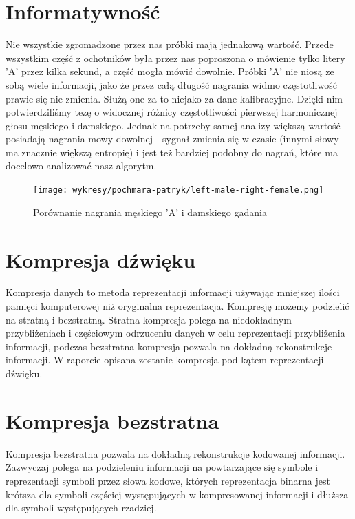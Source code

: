 \documentclass[a4paper,12pt]{extarticle}
\begin{document}
\section*{Informatywność}

Nie wszystkie zgromadzone przez nas próbki mają jednakową wartość. Przede wszystkim część z ochotników była przez nas poproszona o mówienie tylko litery 'A' przez kilka sekund, a część mogła mówić dowolnie. Próbki 'A' nie niosą ze sobą wiele informacji, jako że przez całą długość nagrania widmo częstotliwość prawie się nie zmienia. Służą one za to niejako za dane kalibracyjne. Dzięki nim potwierdziliśmy tezę o widocznej różnicy częstotliwości pierwszej harmonicznej głosu męskiego i damskiego. Jednak na potrzeby samej analizy większą wartość posiadają nagrania mowy dowolnej - sygnał zmienia się w czasie (innymi słowy ma znacznie większą entropię) i jest też bardziej podobny do nagrań, które ma docelowo analizować nasz algorytm.

\begin{figure}[h!]
\centering
\texttt{[image: wykresy/pochmara-patryk/left-male-right-female.png]}
\caption{Porównanie nagrania męskiego 'A' i damskiego gadania}
\end{figure}

\newpage

\section{Kompresja dźwięku}
\label{sec:kompresja}

Kompresja danych to metoda reprezentacji informacji używając mniejszej ilości pamięci komputerowej niż oryginalna reprezentacja. Kompresję możemy podzielić na stratną i bezstratną. Stratna kompresja polega na niedokładnym przybliżeniach i częściowym odrzuceniu danych w celu reprezentacji przybliżenia informacji, podczas bezstratna kompresja pozwala na dokładną rekonstrukcje informacji. W raporcie opisana zostanie kompresja pod kątem reprezentacji dźwięku.

\section*{Kompresja bezstratna}

Kompresja bezstratna pozwala na dokładną rekonstrukcje kodowanej informacji. Zazwyczaj polega na podzieleniu informacji na powtarzające się symbole i reprezentacji symboli przez słowa kodowe, których reprezentacja binarna jest krótsza dla symboli częściej występujących w kompresowanej informacji i dłuższa dla symboli występujących rzadziej.
\end{document}
